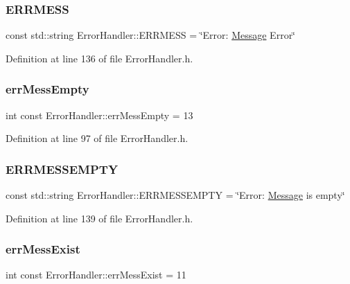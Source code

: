 \subsubsection{\texorpdfstring{ERRMESS}{ERRMESS}}
{\footnotesize\ttfamily const std\+::string Error\+Handler\+::\+E\+R\+R\+M\+E\+SS = \char`\"{}Error\+: \mbox{\hyperlink{classMessage}{Message}} Error\char`\"{}\hspace{0.3cm}{\ttfamily [static]}}



Definition at line 136 of file Error\+Handler.\+h.

\mbox{\label{classErrorHandler_add483ce97592710530c6f746c99c598d}} 
\subsubsection{\texorpdfstring{errMessEmpty}{errMessEmpty}}
{\footnotesize\ttfamily int const Error\+Handler\+::err\+Mess\+Empty = 13\hspace{0.3cm}{\ttfamily [static]}}



Definition at line 97 of file Error\+Handler.\+h.

\mbox{\label{classErrorHandler_a28d8ef2ee23112d4895dd60788c1b152}} 
\subsubsection{\texorpdfstring{ERRMESSEMPTY}{ERRMESSEMPTY}}
{\footnotesize\ttfamily const std\+::string Error\+Handler\+::\+E\+R\+R\+M\+E\+S\+S\+E\+M\+P\+TY = \char`\"{}Error\+: \mbox{\hyperlink{classMessage}{Message}} is empty\char`\"{}\hspace{0.3cm}{\ttfamily [static]}}



Definition at line 139 of file Error\+Handler.\+h.

\mbox{\label{classErrorHandler_a94d4ea423c97ff7a4784ff0043731783}} 
\subsubsection{\texorpdfstring{errMessExist}{errMessExist}}
{\footnotesize\ttfamily int const Error\+Handler\+::err\+Mess\+Exist = 11\hspace{0.3cm}{\ttfamily [static]}}



